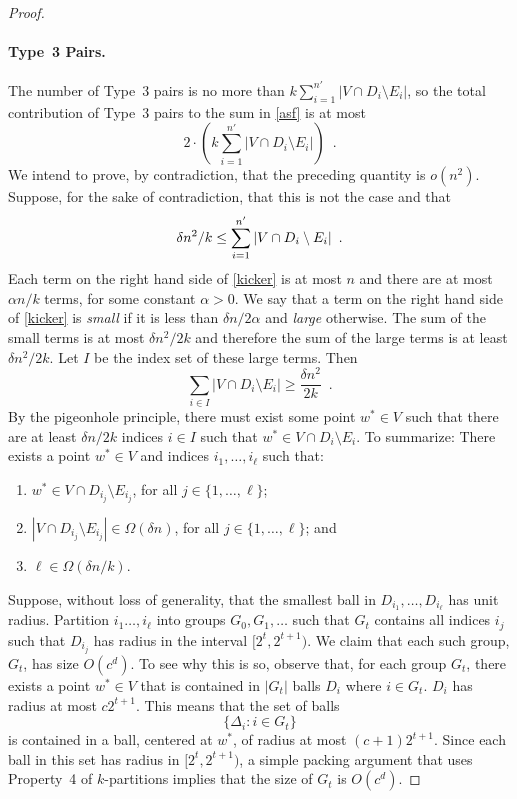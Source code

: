 \documentclass{patmorin}
\begin{document}
\begin{proof}
  \paragraph{Type~3 Pairs.}
  The number of Type~3 pairs is no more than $k\sum_{i=1}^{n'}|V\cap
  D_i\setminus E_i|$, so the total contribution of Type~3 pairs to 
  the sum in \eqref{asf} is at most
  \[
      2\cdot\left(k\sum_{i=1}^{n'} |V\cap D_i\setminus E_i|\right) \enspace .
  \]
  We intend to prove, by contradiction, that the preceding quantity
  is $o(n^2)$.  Suppose, for the sake of contradiction, that this is
  not the case and that
  \begin{equation}
    \delta n^2/k \le \sum_{i=1}^{n'} |V\cap D_i\setminus E_i| 
         \enspace . \eqlabel{kicker}
  \end{equation}
  Each term on the right hand side of \eqref{kicker} is at most $n$
  and there are at most $\alpha n/k$ terms, for some constant $\alpha
  >0$.  We say that a term on the right hand side of \eqref{kicker} is
  \emph{small} if it is less than $\delta n/2\alpha$ and \emph{large}
  otherwise.  The sum of the small terms is at most $\delta n^2/2k$
  and therefore the sum of the large terms is at least $\delta n^2/2k$.
  Let $I$ be the index set of these large terms.  Then
  \[
    \sum_{i\in I} |V\cap D_i\setminus E_i| \ge \frac{\delta n^2}{2k} \enspace .
  \]
  By the pigeonhole principle, there must exist some point $w^*\in V$
  such that there are at least $\delta n/2k$ indices $i\in I$ such
  that $w^*\in V\cap D_i\setminus E_i$.  To summarize: There exists a
  point $w^*\in V$ and indices $i_1,\ldots,i_\ell$ such that:
  \begin{enumerate}
     \item $w^*\in V\cap D_{i_j}\setminus E_{i_j}$, for all
        $j\in\{1,\ldots,\ell\}$;
     \item $|V\cap D_{i_j}\setminus E_{i_j}|\in \Omega(\delta n)$,
       for all $j\in\{1,\ldots,\ell\}$; and
     \item $\ell\in\Omega(\delta n/k)$.
  \end{enumerate}

  Suppose, without loss of generality, that the smallest ball
  in $D_{i_1},\ldots,D_{i_\ell}$ has unit radius.  Partition
  $i_1\ldots,i_\ell$ into groups $G_0,G_1,\ldots$ such that $G_t$
  contains all indices $i_j$ such that $D_{i_j}$ has radius in the
  interval $[2^t,2^{t+1})$.  We claim that each such group, $G_t$, has
  size $O(c^d)$.  To see why this is so, observe that, for each group
  $G_t$, there exists a point $w^*\in V$ that is contained in $|G_t|$
  balls $D_{i}$ where $i\in G_t$.  $D_{i}$ has radius at most $c2^{t+1}$.
  This means that the set of balls
  \[
     \{ \Delta_i : i\in G_t\}
  \]
  is contained in a ball, centered at $w^*$, of radius at most
  $(c+1)2^{t+1}$.  Since each ball in this set has radius in
  $[2^t,2^{t+1})$, a simple packing argument that uses Property~4 of
  $k$-partitions implies that the size of $G_t$ is $O(c^d)$.


\end{proof}
\end{document}
